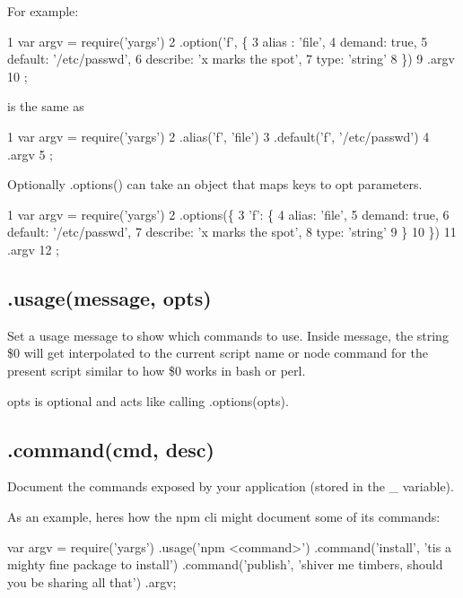 For example\+:


\begin{DoxyCode}
1 var argv = require('yargs')
2     .option('f', \{
3         alias : 'file',
4         demand: true,
5         default: '/etc/passwd',
6         describe: 'x marks the spot',
7         type: 'string'
8     \})
9     .argv
10 ;
\end{DoxyCode}


is the same as


\begin{DoxyCode}
1 var argv = require('yargs')
2     .alias('f', 'file')
3     .default('f', '/etc/passwd')
4     .argv
5 ;
\end{DoxyCode}


Optionally {\ttfamily .options()} can take an object that maps keys to {\ttfamily opt} parameters.


\begin{DoxyCode}
1 var argv = require('yargs')
2     .options(\{
3       'f': \{
4         alias: 'file',
5         demand: true,
6         default: '/etc/passwd',
7         describe: 'x marks the spot',
8         type: 'string'
9       \}
10     \})
11     .argv
12 ;
\end{DoxyCode}


\subsection*{.usage(message, opts) }

Set a usage message to show which commands to use. Inside {\ttfamily message}, the string {\ttfamily \$0} will get interpolated to the current script name or node command for the present script similar to how {\ttfamily \$0} works in bash or perl.

{\ttfamily opts} is optional and acts like calling {\ttfamily .options(opts)}.

\subsection*{.command(cmd, desc) }

Document the commands exposed by your application (stored in the {\ttfamily \+\_\+} variable).

As an example, here\textquotesingle{}s how the npm cli might document some of its commands\+:


\begin{DoxyCode}
var argv = require(\textcolor{stringliteral}{'yargs'})
  .usage(\textcolor{stringliteral}{'npm <command>'})
  .command(\textcolor{stringliteral}{'install'}, \textcolor{stringliteral}{'tis a mighty fine package to install'})
  .command(\textcolor{stringliteral}{'publish'}, \textcolor{stringliteral}{'shiver me timbers, should you be sharing all that'})
  .argv;
\end{DoxyCode}


